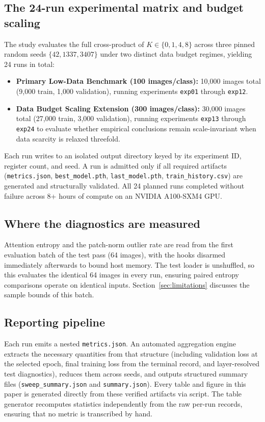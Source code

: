 \subsection{The 24-run experimental matrix and budget scaling}

The study evaluates the full cross-product of $K \in \{0, 1, 4, 8\}$ across three pinned random seeds $\{42, 1337, 3407\}$ under two distinct data budget regimes, yielding 24 runs in total:
\begin{itemize}
\item \textbf{Primary Low-Data Benchmark (100 images/class):} 10{,}000 images total (9{,}000 train, 1{,}000 validation), running experiments \texttt{exp01} through \texttt{exp12}.
\item \textbf{Data Budget Scaling Extension (300 images/class):} 30{,}000 images total (27{,}000 train, 3{,}000 validation), running experiments \texttt{exp13} through \texttt{exp24} to evaluate whether empirical conclusions remain scale-invariant when data scarcity is relaxed threefold.
\end{itemize}

Each run writes to an isolated output directory keyed by its experiment ID, register count, and seed. A run is admitted only if all required artifacts (\texttt{metrics.json}, \texttt{best\_model.pth}, \texttt{last\_model.pth}, \texttt{train\_history.csv}) are generated and structurally validated. All 24 planned runs completed without failure across 8+ hours of compute on an NVIDIA A100-SXM4 GPU.

\subsection{Where the diagnostics are measured}

Attention entropy and the patch-norm outlier rate are read from the first
evaluation batch of the test pass (64 images), with the hooks disarmed
immediately afterwards to bound host memory. The test loader is unshuffled, so
this evaluates the identical 64 images in every run, ensuring paired entropy
comparisons operate on identical inputs. Section~\ref{sec:limitations} discusses
the sample bounds of this batch.

\subsection{Reporting pipeline}

Each run emits a nested \texttt{metrics.json}. An automated aggregation engine extracts
the necessary quantities from that structure (including validation loss at the selected epoch,
final training loss from the terminal record, and layer-resolved test diagnostics), reduces
them across seeds, and outputs structured summary files (\texttt{sweep\_summary.json} and
\texttt{summary.json}). Every table and figure in this paper is generated directly from these
verified artifacts via script. The table generator recomputes statistics independently from
the raw per-run records, ensuring that no metric is transcribed by hand.

